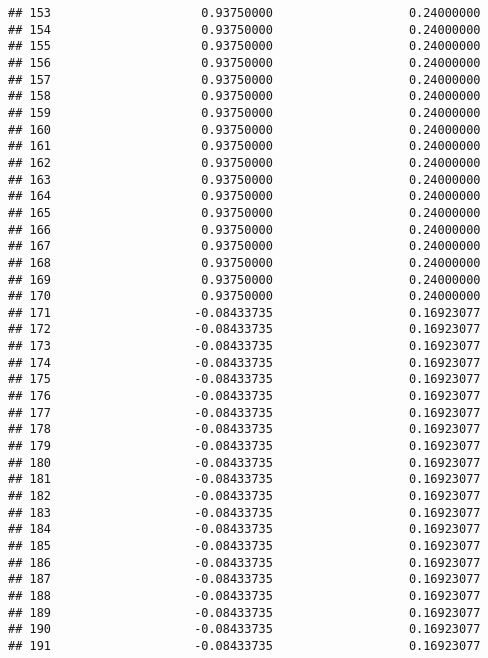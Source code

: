 \documentclass[]{article}
\begin{document}
\begin{verbatim}
## 153                     0.93750000                   0.24000000
## 154                     0.93750000                   0.24000000
## 155                     0.93750000                   0.24000000
## 156                     0.93750000                   0.24000000
## 157                     0.93750000                   0.24000000
## 158                     0.93750000                   0.24000000
## 159                     0.93750000                   0.24000000
## 160                     0.93750000                   0.24000000
## 161                     0.93750000                   0.24000000
## 162                     0.93750000                   0.24000000
## 163                     0.93750000                   0.24000000
## 164                     0.93750000                   0.24000000
## 165                     0.93750000                   0.24000000
## 166                     0.93750000                   0.24000000
## 167                     0.93750000                   0.24000000
## 168                     0.93750000                   0.24000000
## 169                     0.93750000                   0.24000000
## 170                     0.93750000                   0.24000000
## 171                    -0.08433735                   0.16923077
## 172                    -0.08433735                   0.16923077
## 173                    -0.08433735                   0.16923077
## 174                    -0.08433735                   0.16923077
## 175                    -0.08433735                   0.16923077
## 176                    -0.08433735                   0.16923077
## 177                    -0.08433735                   0.16923077
## 178                    -0.08433735                   0.16923077
## 179                    -0.08433735                   0.16923077
## 180                    -0.08433735                   0.16923077
## 181                    -0.08433735                   0.16923077
## 182                    -0.08433735                   0.16923077
## 183                    -0.08433735                   0.16923077
## 184                    -0.08433735                   0.16923077
## 185                    -0.08433735                   0.16923077
## 186                    -0.08433735                   0.16923077
## 187                    -0.08433735                   0.16923077
## 188                    -0.08433735                   0.16923077
## 189                    -0.08433735                   0.16923077
## 190                    -0.08433735                   0.16923077
## 191                    -0.08433735                   0.16923077

\end{verbatim}
\end{document}
